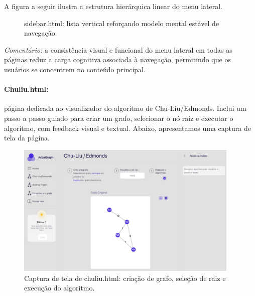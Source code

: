\documentclass[12pt,a4paper]{article}
\def\texttt#1{#1}%
\begin{document}
A figura a seguir ilustra a estrutura hierárquica linear do menu lateral.

\begin{figure}[H]\centering
    \caption{\texttt{sidebar.html}: lista vertical reforçando modelo mental estável de navegação.}
\end{figure}
\textit{Comentário:} a consistência visual e funcional do menu lateral em todas as páginas reduz a carga cognitiva associada à navegação, permitindo que os usuários se concentrem no conteúdo principal.

\paragraph{\texttt{Chuliu.html}:} página dedicada ao visualizador do algoritmo de Chu-Liu/Edmonds. Inclui um passo a passo guiado para criar um grafo, selecionar o nó raiz e executar o algoritmo, com feedback visual e textual. Abaixo, apresentamos uma captura de tela da página.

\begin{figure}[H]\centering
    \includegraphics[width=0.95\textwidth]{../assets/chuliuhtml.png}
    \caption{Captura de tela de \texttt{chuliu.html}: criação de grafo, seleção de raiz e execução do algoritmo.}
    \label{fig:chuliu_html_screenshot}
\end{figure}
\end{document}
